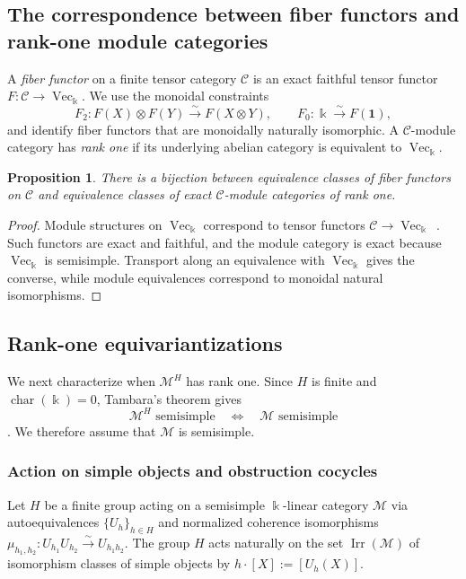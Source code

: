 \documentclass[12pt]{amsart}
\theoremstyle{plain}
\newtheorem{proposition}[theorem]{Proposition}
\theoremstyle{definition} %
\theoremstyle{remark} %
\newcommand{\ku}{{\Bbbk}} %
\DeclareMathOperator{\VecCat}{Vec}
\newcommand{\cC}{\mathcal{C}}
\newcommand{\cM}{\mathcal{M}}
\newcommand{\Irr}{\operatorname{Irr}}
\begin{document}
\subsection{The correspondence between fiber functors and rank-one module categories}

A \emph{fiber functor} on a finite tensor category $\cC$ is an exact faithful tensor functor $F:\cC\to\VecCat_{\ku}$. We use the monoidal constraints
\[
F_2:F(X)\otimes F(Y)\xrightarrow{\sim}F(X\otimes Y),
\qquad
F_0:\ku\xrightarrow{\sim}F(\mathbf1),
\]
and identify fiber functors that are monoidally naturally isomorphic. A $\cC$-module category has \emph{rank one} if its underlying abelian category is equivalent to $\VecCat_{\ku}$.

\begin{proposition}\label{prop:fiber_rank_one}
There is a bijection between equivalence classes of fiber functors on $\cC$ and equivalence classes of exact $\cC$-module categories of rank one.
\end{proposition}

\begin{proof}
Module structures on $\VecCat_{\ku}$ correspond to tensor functors $\cC\to\VecCat_{\ku}$~\cite[Proposition~7.3.3 and Example~7.4.6]{EGNO15}. Such functors are exact and faithful, and the module category is exact because $\VecCat_{\ku}$ is semisimple. Transport along an equivalence with $\VecCat_{\ku}$ gives the converse, while module equivalences correspond to monoidal natural isomorphisms.
\end{proof}

\subsection{Rank-one equivariantizations}

We next characterize when $\cM^H$ has rank one. Since $H$ is finite and
$\operatorname{char}(\ku)=0$, Tambara's theorem gives
\[
\cM^H\text{ semisimple}\quad\Longleftrightarrow\quad \cM\text{ semisimple}
\]
\cite[Proposition~5.2]{T01}. We therefore assume that $\cM$ is semisimple.

\subsubsection{Action on simple objects and obstruction cocycles}

Let $H$ be a finite group acting on a semisimple $\ku$-linear category $\cM$ via autoequivalences $\{U_h\}_{h \in H}$ and normalized coherence isomorphisms $\mu_{h_1,h_2}:U_{h_1}U_{h_2}\xrightarrow{\sim}U_{h_1h_2}$. The group $H$ acts naturally on the set $\Irr(\cM)$ of isomorphism classes of simple objects by $h \cdot [X] := [U_h(X)]$.
\end{document}
